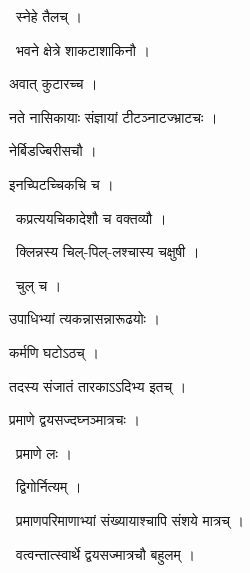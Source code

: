 \documentclass[10pt, openany, oneside]{book}
\begin{document}
\par\noindent\hspace{1.5em}{\vps वा॰}~{\qt स्नेहे तैलच् ।}

\par\noindent\hspace{1.5em}{\vps वा॰}~{\qt भवने क्षेत्रे शाकटाशाकिनौ ।}

\noindent अवात् कुटारच्च ।

\noindent नते नासिकायाः संज्ञायां टीटञ्नाटज्भ्राटचः ।

\noindent नेर्बिडज्बिरीसचौ ।

\noindent इनच्पिटच्चिकचि च ।

\par\noindent\hspace{1.5em}{\vps वा॰}~{\qt कप्रत्ययचिकादेशौ च वक्तव्यौ ।}

\par\noindent\hspace{1.5em}{\vps वा॰}~{\qt क्लिन्नस्य चिल्-पिल्-लश्चास्य चक्षुषी ।}

\par\noindent\hspace{1.5em}{\vps वा॰}~{\qt चुल् च ।}

\noindent उपाधिभ्यां त्यकन्नासन्नारूढयोः ।

\noindent कर्मणि घटोऽठच् ।

\noindent तदस्य संजातं तारकाऽऽदिभ्य इतच् ।

\noindent प्रमाणे द्वयसज्दघ्नञ्मात्रचः ।

\par\noindent\hspace{1.5em}{\vps वा॰}~{\qt प्रमाणे लः ।}

\par\noindent\hspace{1.5em}{\vps वा॰}~{\qt द्विगोर्नित्यम् ।}

\par\noindent\hspace{1.5em}{\vps वा॰}~{\qt प्रमाणपरिमाणाभ्यां संख्यायाश्चापि संशये मात्रच् ।}

\par\noindent\hspace{1.5em}{\vps वा॰}~{\qt वत्वन्तात्स्वार्थे द्वयसज्मात्रचौ बहुलम् ।}
\end{document}
